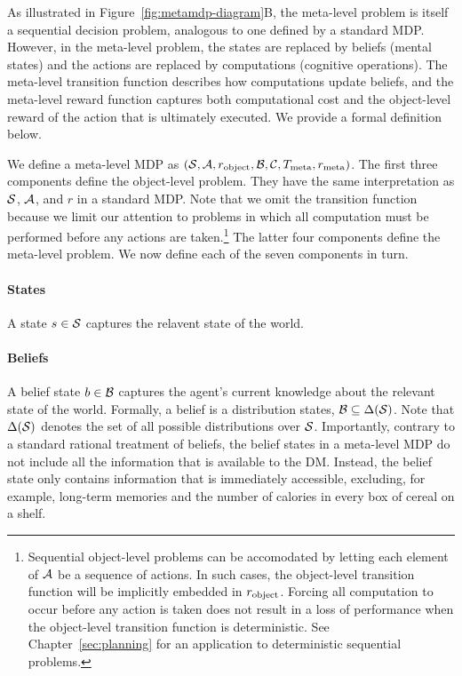 As illustrated in Figure~\ref{fig:metamdp-diagram}B, the meta-level problem is itself a sequential decision problem, analogous to one defined by a standard MDP. However, in the meta-level problem, the states are replaced by beliefs (mental states) and the actions are replaced by computations (cognitive operations). The meta-level transition function describes how computations update beliefs, and the meta-level reward function captures both computational cost and the object-level reward of the action that is ultimately executed. We provide a formal definition below.

We define a meta-level MDP as $(\S, \A, r\object, \B, \C, T\meta, r\meta)$. The first three components define the object-level problem. They have the same interpretation as $\S$, $\A$, and $r$ in a standard MDP. Note that we omit the transition function because we limit our attention to problems in which all computation must be performed before any actions are taken.\footnote{%
  Sequential object-level problems can be accomodated by letting each element of $\A$ be a sequence of actions. In such cases, the object-level transition function will be implicitly embedded in $r\object$. Forcing all computation to occur before any action is taken does not result in a loss of performance when the object-level transition function is deterministic. See Chapter~\ref{sec:planning} for an application to deterministic sequential problems.
} The latter four components define the meta-level problem. We now define each of the seven components in turn.

\paragraph{States}
A state $s \in \S$ captures the relavent state of the world.

\paragraph{Beliefs}
A belief state $b \in \B$ captures the agent's current knowledge about the relevant state of the world. Formally, a belief is a distribution states, $\B \subseteq \Delta(\S)$. Note that $\Delta(\S)$ denotes the set of all possible distributions over $\S$.
Importantly, contrary to a standard rational treatment of beliefs, the belief states in a meta-level MDP do not include all the information that is available to the DM. Instead, the belief state only contains information that is immediately accessible, excluding, for example, long-term memories and the number of calories in every box of cereal on a shelf.

